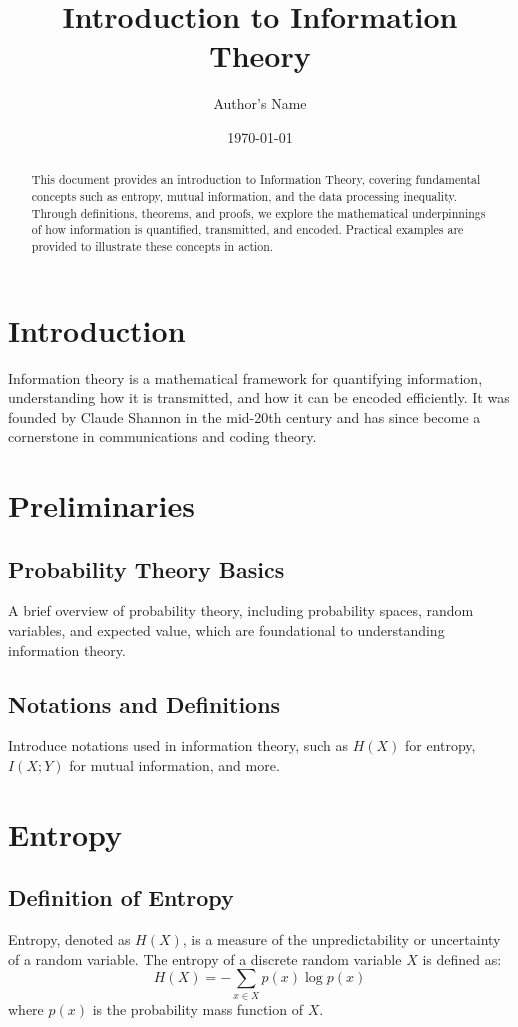 \documentclass[12pt]{article}
\title{Introduction to Information Theory}
\author{Author's Name}
\date{\today}
\begin{document}
\maketitle

\begin{abstract}
This document provides an introduction to Information Theory, covering fundamental concepts such as entropy, mutual information, and the data processing inequality. Through definitions, theorems, and proofs, we explore the mathematical underpinnings of how information is quantified, transmitted, and encoded. Practical examples are provided to illustrate these concepts in action.
\end{abstract}

\tableofcontents

\newpage

\section{Introduction}
Information theory is a mathematical framework for quantifying information, understanding how it is transmitted, and how it can be encoded efficiently. It was founded by Claude Shannon in the mid-20th century and has since become a cornerstone in communications and coding theory.

\section{Preliminaries}
\subsection{Probability Theory Basics}
A brief overview of probability theory, including probability spaces, random variables, and expected value, which are foundational to understanding information theory.

\subsection{Notations and Definitions}
Introduce notations used in information theory, such as \(H(X)\) for entropy, \(I(X;Y)\) for mutual information, and more.

\section{Entropy}
\subsection{Definition of Entropy}
Entropy, denoted as \(H(X)\), is a measure of the unpredictability or uncertainty of a random variable. The entropy of a discrete random variable \(X\) is defined as:
\[
H(X) = -\sum_{x \in X} p(x) \log p(x)
\]
where \(p(x)\) is the probability mass function of \(X\).
\end{document}
